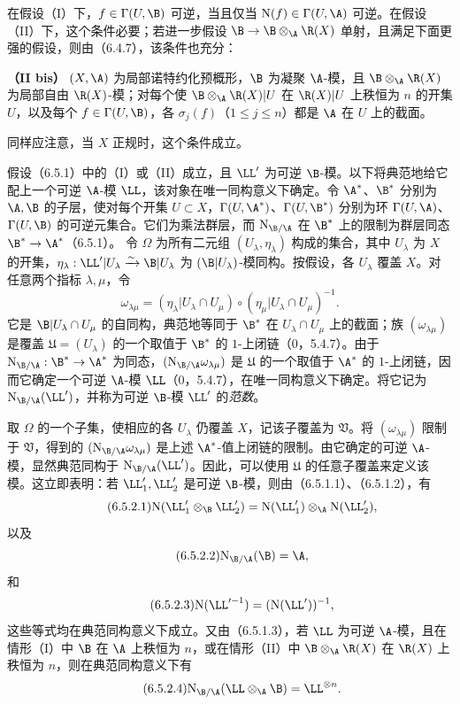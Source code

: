 在假设（I）下，$f\in\Gamma(U,\B)$ 可逆，当且仅当 $\mathrm N(f)\in\Gamma(U,\A)$ 可逆。在假设（II）下，这个条件必要；若进一步假设 $\B\to\B\otimes_\A\R(X)$ 单射，且满足下面更强的假设，则由（6.4.7），该条件也充分：

\noindent\textbf{（II bis）} $(X,\A)$ 为局部诺特约化预概形，$\B$ 为凝聚 $\A$-模，且 $\B\otimes_\A\R(X)$ 为局部自由 $\R(X)$-模；对每个使 $\B\otimes_\A\R(X)|U$ 在 $\R(X)|U$ 上秩恒为 $n$ 的开集 $U$，以及每个 $f\in\Gamma(U,\B)$，各 $\sigma_j(f)$（$1\leq j\leq n$）都是 $\A$ 在 $U$ 上的截面。

同样应注意，当 $X$ 正规时，这个条件成立。

假设（6.5.1）中的（I）或（II）成立，且 $\LL'$ 为可逆 $\B$-模。以下将典范地给它配上一个可逆 $\A$-模 $\LL$，该对象在唯一同构意义下确定。令 $\A^*$、$\B^*$ 分别为 $\A,\B$ 的子层，使对每个开集 $U\subset X$，$\Gamma(U,\A^*)$、$\Gamma(U,\B^*)$ 分别为环 $\Gamma(U,\A)$、$\Gamma(U,\B)$ 的可逆元集合。它们为乘法群层，而 $\mathrm N_{\B/\A}$ 在 $\B^*$ 上的限制为群层同态 $\B^*\to\A^*$（6.5.1）。
令 $\Omega$ 为所有二元组 $(U_\lambda,\eta_\lambda)$ 构成的集合，其中 $U_\lambda$ 为 $X$ 的开集，$\eta_\lambda:\LL'|U_\lambda\xrightarrow{\sim}\B|U_\lambda$ 为 $(\B|U_\lambda)$-模同构。按假设，各 $U_\lambda$ 覆盖 $X$。对任意两个指标 $\lambda,\mu$，令
\[
\omega_{\lambda\mu}=(\eta_\lambda|U_\lambda\cap U_\mu)
\circ(\eta_\mu|U_\lambda\cap U_\mu)^{-1}.
\]
它是 $\B|U_\lambda\cap U_\mu$ 的自同构，典范地等同于 $\B^*$ 在 $U_\lambda\cap U_\mu$ 上的截面；族 $(\omega_{\lambda\mu})$ 是覆盖 $\mathfrak U=(U_\lambda)$ 的一个取值于 $\B^*$ 的 $1$-上闭链（0，5.4.7）。由于 $\mathrm N_{\B/\A}:\B^*\to\A^*$ 为同态，$(\mathrm N_{\B/\A}\omega_{\lambda\mu})$ 是 $\mathfrak U$ 的一个取值于 $\A^*$ 的 $1$-上闭链，因而它确定一个可逆 $\A$-模 $\LL$（0，5.4.7），在唯一同构意义下确定。将它记为 $\mathrm N_{\B/\A}(\LL')$，并称为可逆 $\B$-模 $\LL'$ 的\emph{范数}。

取 $\Omega$ 的一个子集，使相应的各 $U_\lambda$ 仍覆盖 $X$，记该子覆盖为 $\mathfrak V$。将 $(\omega_{\lambda\mu})$ 限制于 $\mathfrak V$，得到的 $(\mathrm N_{\B/\A}\omega_{\lambda\mu})$ 是上述 $\A^*$-值上闭链的限制。由它确定的可逆 $\A$-模，显然典范同构于 $\mathrm N_{\B/\A}(\LL')$。因此，可以使用 $\mathfrak U$ 的任意子覆盖来定义该模。这立即表明：若 $\LL'_1,\LL'_2$ 是可逆 $\B$-模，则由（6.5.1.1）、（6.5.1.2），有
\begin{equation}\tag{6.5.2.1}
\mathrm N(\LL'_1\otimes_\B\LL'_2)=\mathrm N(\LL'_1)\otimes_\A\mathrm N(\LL'_2),
\end{equation}
以及
\begin{equation}\tag{6.5.2.2}
\mathrm N_{\B/\A}(\B)=\A,
\end{equation}
和
\begin{equation}\tag{6.5.2.3}
\mathrm N(\LL'^{-1})=(\mathrm N(\LL'))^{-1},
\end{equation}
这些等式均在典范同构意义下成立。又由（6.5.1.3），若 $\LL$ 为可逆 $\A$-模，且在情形（I）中 $\B$ 在 $\A$ 上秩恒为 $n$，或在情形（II）中 $\B\otimes_\A\R(X)$ 在 $\R(X)$ 上秩恒为 $n$，则在典范同构意义下有
\begin{equation}\tag{6.5.2.4}
\mathrm N_{\B/\A}(\LL\otimes_\A\B)=\LL^{\otimes n}.
\end{equation}


